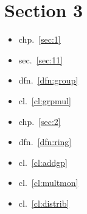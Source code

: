 \hypertarget{section-3}{%
\section{\texorpdfstring{\label{section-3}Section
3}{Section 3}}\label{section-3}}

\begin{itemize}
\item
  chp.~\ref{sec:1}
\item
  sec.~\ref{sec:11}
\item
  dfn.~\ref{dfn:group}
\item
  cl.~\ref{cl:grpmul}
\item
  chp.~\ref{sec:2}
\item
  dfn.~\ref{dfn:ring}
\item
  cl.~\ref{cl:addgp}
\item
  cl.~\ref{cl:multmon}
\item
  cl.~\ref{cl:distrib}
\end{itemize}
